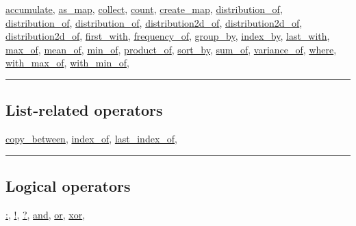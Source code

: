 \documentclass[]{book}
\theoremstyle{definition}
\theoremstyle{definition}
\theoremstyle{definition}
\theoremstyle{remark}
\begin{document}
\href{operators-a-to-a.html\#accumulate}{accumulate},
\href{operators-a-to-a.html\#as_map}{as\_map},
\href{operators-b-to-c.html\#collect}{collect},
\href{operators-b-to-c.html\#count}{count},
\href{operators-b-to-c.html\#create_map}{create\_map},
\href{operators-d-to-h.html\#distribution_of}{distribution\_of},
\href{operators-d-to-h.html\#distribution_of}{distribution\_of},
\href{operators-d-to-h.html\#distribution_of}{distribution\_of},
\href{operators-d-to-h.html\#distribution2d_of}{distribution2d\_of},
\href{operators-d-to-h.html\#distribution2d_of}{distribution2d\_of},
\href{operators-d-to-h.html\#distribution2d_of}{distribution2d\_of},
\href{operators-d-to-h.html\#first_with}{first\_with},
\href{operators-d-to-h.html\#frequency_of}{frequency\_of},
\href{operators-d-to-h.html\#group_by}{group\_by},
\href{operators-i-to-m.html\#index_by}{index\_by},
\href{operators-i-to-m.html\#last_with}{last\_with},
\href{operators-i-to-m.html\#max_of}{max\_of},
\href{operators-i-to-m.html\#mean_of}{mean\_of},
\href{operators-i-to-m.html\#min_of}{min\_of},
\href{operators-n-to-r.html\#product_of}{product\_of},
\href{operators-s-to-z.html\#sort_by}{sort\_by},
\href{operators-s-to-z.html\#sum_of}{sum\_of},
\href{operators-s-to-z.html\#variance_of}{variance\_of},
\href{operators-s-to-z.html\#where}{where},
\href{operators-s-to-z.html\#with_max_of}{with\_max\_of},
\href{operators-s-to-z.html\#with_min_of}{with\_min\_of},

\begin{center}\rule{0.5\linewidth}{\linethickness}\end{center}

\subsection{List-related operators}\label{list-related-operators}

\href{operators-b-to-c.html\#copy_between}{copy\_between},
\href{operators-i-to-m.html\#index_of}{index\_of},
\href{operators-i-to-m.html\#last_index_of}{last\_index\_of},

\begin{center}\rule{0.5\linewidth}{\linethickness}\end{center}

\subsection{Logical operators}\label{logical-operators}

\href{operators-a-to-a.html\#:}{:}, \href{operators-a-to-a.html\#!}{!},
\href{operators-a-to-a.html\#?}{?},
\href{operators-a-to-a.html\#and}{and},
\href{operators-n-to-r.html\#or}{or},
\href{operators-s-to-z.html\#xor}{xor},
\end{document}
